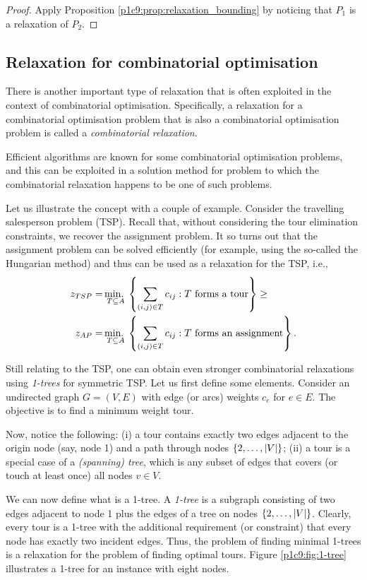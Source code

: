 \begin{proof}
	Apply Proposition \ref{p1c9:prop:relaxation_bounding} by noticing that $P_1$ is a relaxation of $P_2$. 
\end{proof}


\subsection{Relaxation for combinatorial optimisation}

There is another important type of relaxation that is often exploited in the context of combinatorial optimisation. Specifically, a relaxation for a combinatorial optimisation problem that is also a combinatorial optimisation problem is called a \emph{combinatorial relaxation}.

Efficient algorithms are known for some combinatorial optimisation problems, and this can be exploited in a solution method for problem to which the combinatorial relaxation happens to be one of such problems. 

Let us illustrate the concept with a couple of example. Consider the travelling salesperson problem (TSP). Recall that, without considering the tour elimination constraints, we recover the assignment problem. It so turns out that the assignment problem can be solved efficiently (for example, using the so-called the Hungarian method) and thus can be used as a relaxation for the TSP, i.e.,
%
\begin{align*}
	z_{TSP} = &\mathop{\text{min.~}}_{T\subseteq A}\left\{ \sum_{(i,j)\in T} c_{ij} : T \text{ forms a tour} \right \} \geq \\
	z_{AP} = &\mathop{\text{min.~}}_{T\subseteq A}\left\{ \sum_{(i,j)\in T} c_{ij} : T \text{ forms an assignment} \right \}. 
\end{align*}
%

Still relating to the TSP, one can obtain even stronger combinatorial relaxations using \emph{1-trees} for symmetric TSP. Let us first define some elements.  Consider an undirected graph $G = (V,E)$ with edge (or arcs) weights $c_e$ for $e \in E$. The objective is to find a minimum weight tour.

Now, notice the following: (i) a tour contains exactly two edges adjacent to the origin node (say, node 1) and a path through nodes $\left\{ 2, \dots, |V| \right \}$; (ii) a tour is a special case of a \emph{(spanning) tree}, which is any subset of edges that covers (or touch at least once) all nodes $v \in V$. 

We can now define what is a 1-tree. A \emph{1-tree} is a subgraph consisting of two edges adjacent to node 1 plus the edges of a tree on nodes $\left\{ 2, \dots, |V| \right \}$. Clearly, every tour is a 1-tree with the additional requirement (or constraint) that every node has exactly two incident edges. Thus, the problem of finding minimal 1-trees is a relaxation for the problem of finding optimal tours. Figure \ref{p1c9:fig:1-tree} illustrates a 1-tree for an instance with eight nodes.

